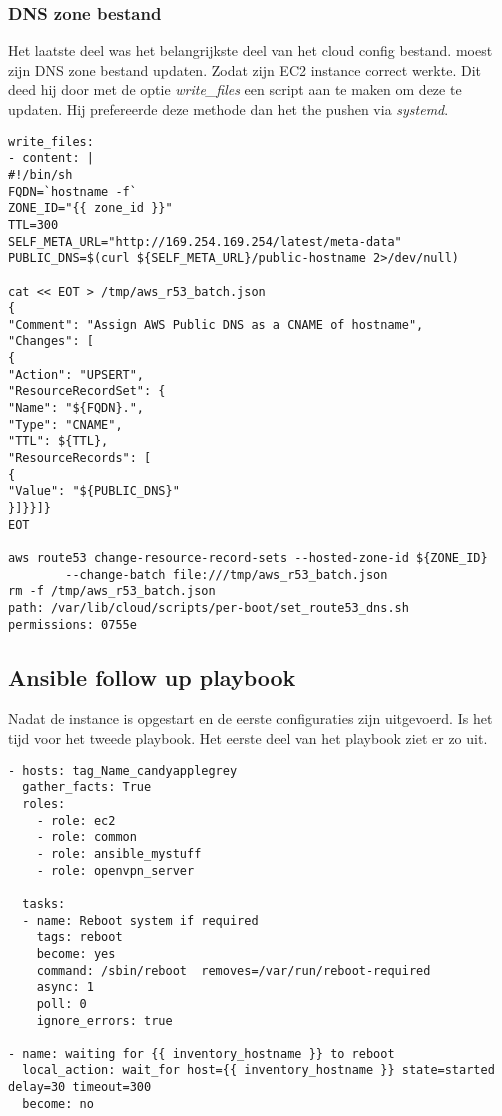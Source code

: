 \subsubsection{DNS zone bestand}
Het laatste deel was het belangrijkste deel van het cloud config bestand. \autocite{scottharney} moest zijn DNS zone bestand updaten. Zodat zijn EC2 instance correct werkte. Dit deed hij door met de optie \textit{write\_files} een script aan te maken om deze te updaten. Hij prefereerde deze methode dan het the pushen via \textit{systemd}.
\begin{lstlisting}
write_files:
- content: |
#!/bin/sh
FQDN=`hostname -f`
ZONE_ID="{{ zone_id }}"
TTL=300
SELF_META_URL="http://169.254.169.254/latest/meta-data"
PUBLIC_DNS=$(curl ${SELF_META_URL}/public-hostname 2>/dev/null)

cat << EOT > /tmp/aws_r53_batch.json
{
"Comment": "Assign AWS Public DNS as a CNAME of hostname",
"Changes": [
{
"Action": "UPSERT",
"ResourceRecordSet": {
"Name": "${FQDN}.",
"Type": "CNAME",
"TTL": ${TTL},
"ResourceRecords": [
{
"Value": "${PUBLIC_DNS}"
}]}}]}
EOT

aws route53 change-resource-record-sets --hosted-zone-id ${ZONE_ID} 
		--change-batch file:///tmp/aws_r53_batch.json
rm -f /tmp/aws_r53_batch.json
path: /var/lib/cloud/scripts/per-boot/set_route53_dns.sh
permissions: 0755e
\end{lstlisting}
\subsection{Ansible follow up playbook}

Nadat de instance is opgestart en de eerste configuraties zijn uitgevoerd. Is het tijd voor het tweede playbook. Het eerste deel van het playbook ziet er zo uit.

\begin{lstlisting}
- hosts: tag_Name_candyapplegrey
  gather_facts: True
  roles:
    - role: ec2
    - role: common
    - role: ansible_mystuff
    - role: openvpn_server

  tasks:
  - name: Reboot system if required
    tags: reboot
    become: yes
    command: /sbin/reboot  removes=/var/run/reboot-required 
    async: 1
    poll: 0
    ignore_errors: true

- name: waiting for {{ inventory_hostname }} to reboot
  local_action: wait_for host={{ inventory_hostname }} state=started delay=30 timeout=300 
  become: no
\end{lstlisting}

